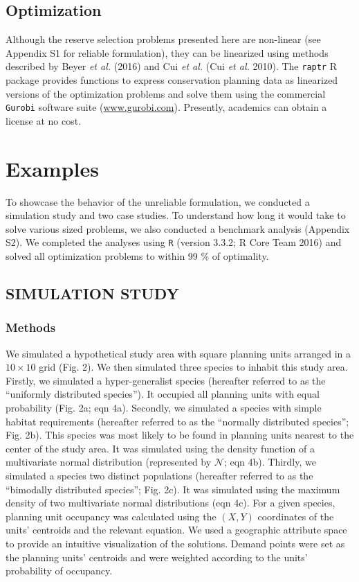 \subsection{Optimization}\label{optimization}

Although the reserve selection problems presented here are non-linear
(see Appendix S1 for reliable formulation), they can be linearized using
methods described by Beyer \emph{et al.} (2016) and Cui \emph{et al.}
(Cui \emph{et al.} 2010). The \texttt{raptr} R package provides
functions to express conservation planning data as linearized versions
of the optimization problems and solve them using the commercial
\texttt{Gurobi} software suite (\url{www.gurobi.com}). Presently,
academics can obtain a license at no cost.

\section{Examples}\label{examples}

To showcase the behavior of the unreliable formulation, we conducted a
simulation study and two case studies. To understand how long it would
take to solve various sized problems, we also conducted a benchmark
analysis (Appendix S2). We completed the analyses using \texttt{R}
(version 3.3.2; R Core Team 2016) and solved all optimization problems
to within 99 \% of optimality.

\subsection{SIMULATION STUDY}\label{simulation-study}

\subsubsection{Methods}\label{methods-1}

We simulated a hypothetical study area with square planning units
arranged in a \(10 \times 10\) grid (Fig. 2). We then simulated three
species to inhabit this study area. Firstly, we simulated a
hyper-generalist species (hereafter referred to as the ``uniformly
distributed species''). It occupied all planning units with equal
probability (Fig. 2a; eqn 4a). Secondly, we simulated a species with
simple habitat requirements (hereafter referred to as the ``normally
distributed species''; Fig. 2b). This species was most likely to be
found in planning units nearest to the center of the study area. It was
simulated using the density function of a multivariate normal
distribution (represented by \(\mathcal{N}\); eqn 4b). Thirdly, we
simulated a species two distinct populations (hereafter referred to as
the ``bimodally distributed species''; Fig. 2c). It was simulated using
the maximum density of two multivariate normal distributions (eqn 4c).
For a given species, planning unit occupancy was calculated using the
\((X, Y)\) coordinates of the units' centroids and the relevant
equation. We used a geographic attribute space to provide an intuitive
visualization of the solutions. Demand points were set as the planning
units' centroids and were weighted according to the units' probability
of occupancy.

